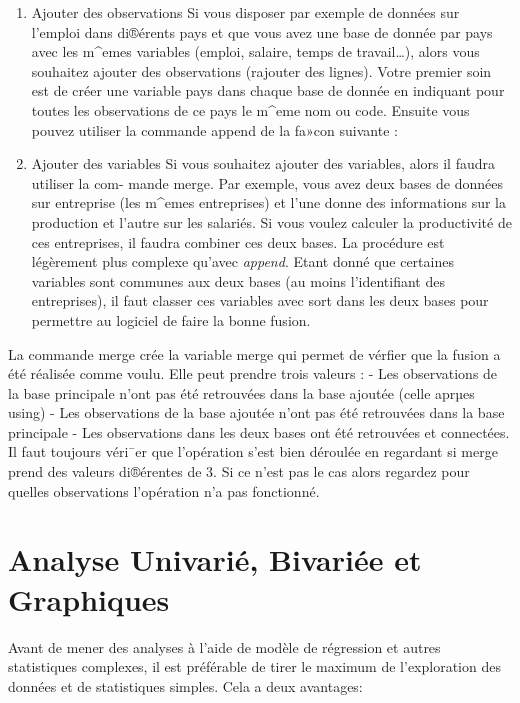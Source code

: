 \documentclass[
]{book}
\begin{document}
\begin{enumerate}
\def\labelenumi{(\arabic{enumi})}
\item
  Ajouter des observations Si vous disposer par exemple de données sur l'emploi dans di®érents
  pays et que vous avez une base de donnée par pays avec les m\^{}emes variables (emploi, salaire,
  temps de travail\ldots), alors vous souhaitez ajouter des observations (rajouter des lignes). Votre
  premier soin est de créer une variable pays dans chaque base de donnée en indiquant pour
  toutes les observations de ce pays le m\^{}eme nom ou code. Ensuite vous pouvez utiliser la
  commande append de la fa»con suivante :
\item
  Ajouter des variables Si vous souhaitez ajouter des variables, alors il faudra utiliser la com-
  mande merge. Par exemple, vous avez deux bases de données sur entreprise (les m\^{}emes
  entreprises) et l'une donne des informations sur la production et l'autre sur les salariés. Si vous voulez calculer la productivité de ces entreprises, il faudra combiner ces deux bases. La procédure est légèrement plus complexe qu'avec \emph{append}. Etant donné que certaines variables sont communes aux deux bases (au moins l'identifiant des entreprises), il faut classer ces variables avec sort dans les deux bases pour permettre au logiciel de faire la bonne fusion.
\end{enumerate}

La commande merge crée la variable merge qui permet de vérfier que la fusion a été réalisée
comme voulu. Elle peut prendre trois valeurs :
- Les observations de la base principale n'ont pas été retrouvées dans la base ajoutée
(celle aprµes using)
- Les observations de la base ajoutée n'ont pas été retrouvées dans la base principale
- Les observations dans les deux bases ont été retrouvées et connectées.
Il faut toujours véri¯er que l'opération s'est bien déroulée en regardant si merge prend des valeurs di®érentes de 3. Si ce n'est pas le cas alors regardez pour quelles observations l'opération n'a pas fonctionné.

\hypertarget{analyse-univariuxe9-bivariuxe9e-et-graphiques}{%
\chapter{Analyse Univarié, Bivariée et Graphiques}\label{analyse-univariuxe9-bivariuxe9e-et-graphiques}}

Avant de mener des analyses à l'aide de modèle de régression et
autres statistiques complexes, il est préférable de tirer le
maximum de l'exploration des données et de statistiques
simples. Cela a deux avantages:
\end{document}
